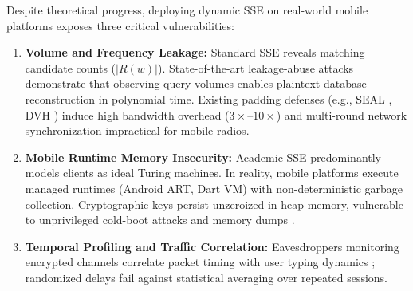 \documentclass[10pt,conference]{IEEEtran}
\begin{document}
\enlargethispage{1.5\baselineskip}
Despite theoretical progress, deploying dynamic SSE on real-world mobile platforms exposes three critical vulnerabilities:
\begin{enumerate}\setlength{\itemsep}{1pt}\setlength{\parskip}{0pt}
    \item \textbf{Volume and Frequency Leakage:} Standard SSE reveals matching candidate counts ($|R(w)|$). State-of-the-art leakage-abuse attacks \cite{kellaris2016,gui2019volume} demonstrate that observing query volumes enables plaintext database reconstruction in polynomial time. Existing padding defenses (e.g., SEAL \cite{demertzis2020seal}, DVH \cite{patel2023dvh}) induce high bandwidth overhead ($3\times$--$10\times$) and multi-round network synchronization impractical for mobile radios.
    \item \textbf{Mobile Runtime Memory Insecurity:} Academic SSE predominantly models clients as ideal Turing machines. In reality, mobile platforms execute managed runtimes (Android ART, Dart VM) with non-deterministic garbage collection. Cryptographic keys persist unzeroized in heap memory, vulnerable to unprivileged cold-boot attacks and memory dumps \cite{kocher1996,rustee2020}.
    \item \textbf{Temporal Profiling and Traffic Correlation:} Eavesdroppers monitoring encrypted channels correlate packet timing with user typing dynamics \cite{swat2024}; randomized delays fail against statistical averaging over repeated sessions.
\end{enumerate}
\end{document}
